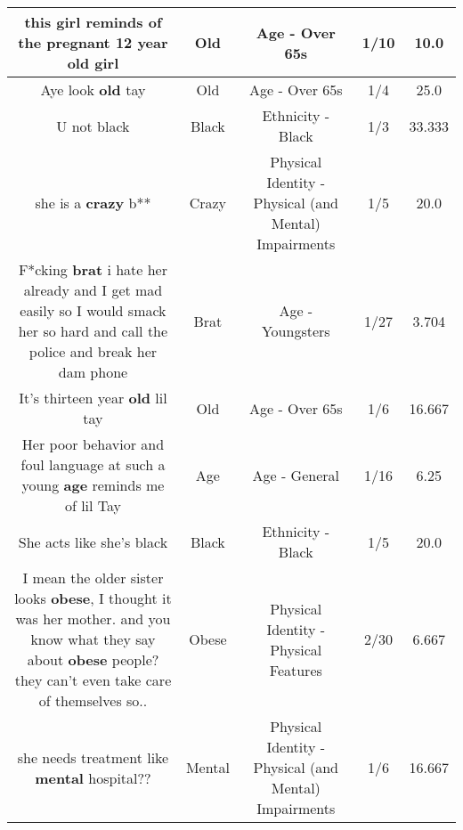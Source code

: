 \documentclass[11pt]{article}
\newlength\mylength
\begin{document}
\begin{center}
\begin{longtable}{|C{.65\mylength}|C{.30\mylength}|C{.12\mylength}|C{.12\mylength}|C{.12\mylength}|}
  \small this girl reminds of the pregnant 12 year \textbf{old} girl\normalsize   & Old & Age - Over 65s & 1/10 & 10.0 \\  \hline
  \small Aye look \textbf{old} tay\normalsize   & Old & Age - Over 65s & 1/4 & 25.0 \\  \hline
  \small U not black\normalsize   & Black & Ethnicity - Black & 1/3 & 33.333 \\  \hline
  \small she is a \textbf{crazy} b**\normalsize   & Crazy & Physical Identity - Physical (and Mental) Impairments & 1/5 & 20.0 \\  \hline
  \small F*cking \textbf{brat}  i hate her already and I get mad easily so I would smack her so hard and call the police  and break her dam phone\normalsize   & Brat & Age - Youngsters & 1/27 & 3.704 \\  \hline
  \small It's thirteen year \textbf{old} lil tay\normalsize   & Old & Age - Over 65s & 1/6 & 16.667 \\  \hline
  \small Her poor behavior and foul language at such a young \textbf{age} reminds me of lil Tay\normalsize   & Age & Age - General & 1/16 & 6.25 \\  \hline
  \small She acts like she's black\normalsize   & Black & Ethnicity - Black & 1/5 & 20.0 \\  \hline
  \small I mean the older sister looks \textbf{obese}, I thought it was her mother. and you know what they say about \textbf{obese} people? they can't even take care of themselves so..\normalsize   & Obese & Physical Identity - Physical Features & 2/30 & 6.667 \\  \hline
  \small she needs treatment like \textbf{mental} hospital??\normalsize   & Mental & Physical Identity - Physical (and Mental) Impairments & 1/6 & 16.667 \\  \hline

\end{longtable}
\end{center}
\end{document}
